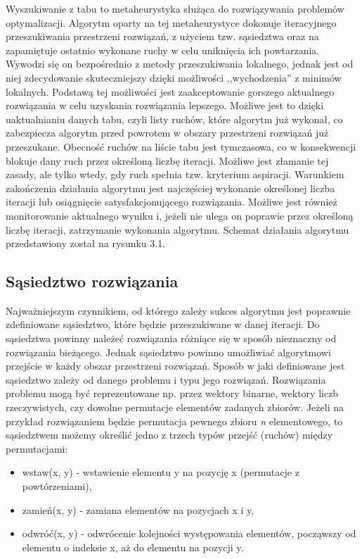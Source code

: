 Wyszukiwanie z tabu to metaheurystyka służąca do rozwiązywania problemów optymalizacji. Algorytm oparty na tej metaheurystyce dokonuje iteracyjnego przeszukiwania przestrzeni rozwiązań, z użyciem tzw. sąsiedztwa oraz na zapamiętuje ostatnio wykonane ruchy w celu uniknięcia ich powtarzania. Wywodzi się on bezpośrednio z metody przeszukiwania lokalnego, jednak jest od niej zdecydowanie skuteczniejszy dzięki możliwości ,,wychodzenia'' z minimów lokalnych. Podstawą tej możliwości jest zaakceptowanie gorszego aktualnego rozwiązania w celu uzyskania rozwiązania lepszego. Możliwe jest to dzięki uaktualnianiu danych tabu, czyli listy ruchów, które algorytm już wykonał, co zabezpiecza algorytm przed powrotem w obszary przestrzeni rozwiązań już przeszukane. Obecność ruchów na liście tabu jest tymczasowa, co w konsekwencji blokuje dany ruch przez określoną liczbę iteracji. Możliwe jest złamanie tej zasady, ale tylko wtedy, gdy ruch spełnia tzw. kryterium aspiracji. Warunkiem zakończenia działania algorytmu jest najczęściej wykonanie określonej liczba iteracji lub osiągnięcie satysfakcjonującego rozwiązania. Możliwe jest również monitorowanie aktualnego wyniku i, jeżeli nie ulega on poprawie przez określoną liczbę iteracji, zatrzymanie wykonania algorytmu. Schemat działania algorytmu przedstawiony został na rysunku 3.1.

\subsection{Sąsiedztwo rozwiązania}

Najważniejszym czynnikiem, od którego zależy sukces algorytmu jest poprawnie zdefiniowane sąsiedztwo, które będzie przeszukiwane w danej iteracji. Do sąsiedztwa powinny należeć rozwiązania różniące się w sposób nieznaczny od rozwiązania bieżącego. Jednak sąsiedztwo powinno umożliwiać algorytmowi przejście w każdy obszar przestrzeni rozwiązań. Sposób w jaki definiowane jest sąsiedztwo zależy od danego problemu i typu jego rozwiązań. Rozwiązania problemu mogą być reprezentowane np. przez wektory binarne, wektory liczb rzeczywistych, czy dowolne permutacje elementów zadanych zbiorów. Jeżeli na przykład rozwiązaniem będzie permutacja pewnego zbioru \textit{n} elementowego, to sąsiedztwem możemy określić jedno z trzech typów przejść (ruchów) między permutacjami:

\begin{itemize}
	\item wstaw(x, y) - wstawienie elementu y na pozycję x (permutacje z powtórzeniami),
	\item zamień(x, y) - zamiana elementów na pozycjach x i y,
	\item odwróć(x, y) - odwrócenie kolejności występowania elementów, począwszy od elementu o indeksie x, aż do elementu na pozycji y.
\end{itemize}

